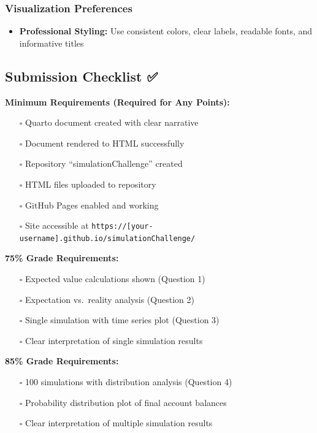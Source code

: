 \documentclass[
  letterpaper,
  DIV=11,
  numbers=noendperiod]{scrartcl}
\providecommand{\tightlist}{%
  \setlength{\itemsep}{0pt}\setlength{\parskip}{0pt}}
\theoremstyle{definition}
\theoremstyle{remark}
\begin{document}
\subsubsection{Visualization
Preferences}\label{visualization-preferences}

\begin{itemize}
\tightlist
\item
  \textbf{Professional Styling:} Use consistent colors, clear labels,
  readable fonts, and informative titles
\end{itemize}

\subsection{Submission Checklist ✅}\label{submission-checklist}

\textbf{Minimum Requirements (Required for Any Points):}

\begin{itemize}
\tightlist
\item[$\square$]
  Quarto document created with clear narrative
\item[$\square$]
  Document rendered to HTML successfully
\item[$\square$]
  Repository ``simulationChallenge'' created
\item[$\square$]
  HTML files uploaded to repository
\item[$\square$]
  GitHub Pages enabled and working
\item[$\square$]
  Site accessible at
  \texttt{https://{[}your-username{]}.github.io/simulationChallenge/}
\end{itemize}

\textbf{75\% Grade Requirements:}

\begin{itemize}
\tightlist
\item[$\square$]
  Expected value calculations shown (Question 1)
\item[$\square$]
  Expectation vs.~reality analysis (Question 2)
\item[$\square$]
  Single simulation with time series plot (Question 3)
\item[$\square$]
  Clear interpretation of single simulation results
\end{itemize}

\textbf{85\% Grade Requirements:}

\begin{itemize}
\tightlist
\item[$\square$]
  100 simulations with distribution analysis (Question 4)
\item[$\square$]
  Probability distribution plot of final account balances
\item[$\square$]
  Clear interpretation of multiple simulation results
\end{itemize}
\end{document}
